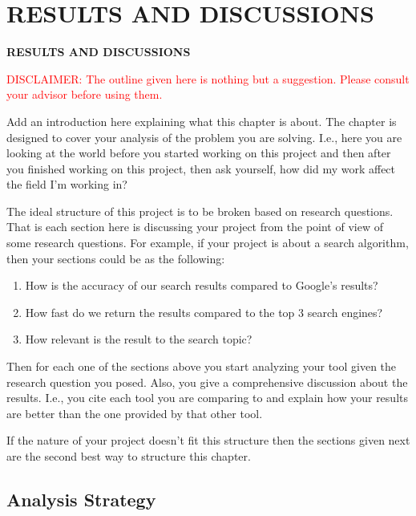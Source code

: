 \chapter{RESULTS AND DISCUSSIONS}
\pagebreak


\begin{center}
{\LARGE\textbf{RESULTS AND DISCUSSIONS}}
\end{center}

\textcolor{red}{DISCLAIMER: The outline given here is nothing but a suggestion. Please consult your advisor before using them.}

Add an introduction here explaining what this chapter is about. The chapter is designed to cover your analysis of the problem you are solving. I.e., here you are looking at the world before you started working on this project and then after you finished working on this project, then ask yourself, how did my work affect the field I'm working in?

The ideal structure of this project is to be broken based on research questions. That is each section here is discussing your project from the point of view of some research questions. For example, if your project is about a search algorithm, then your sections could be as the following:

\begin{enumerate}
    \item How is the accuracy of our search results compared to Google's results?
    \item How fast do we return the results compared to the top 3 search engines?
    \item How relevant is the result to the search topic?
\end{enumerate}

Then for each one of the sections above you start analyzing your tool given the research question you posed. Also, you give a comprehensive discussion about the results. I.e., you cite each tool you are comparing to and explain how your results are better than the one provided by that other tool.

If the nature of your project doesn't fit this structure then the sections given next are the second best way to structure this chapter. 


\section{Analysis Strategy} %
\label{sec:analysis_strategy}

